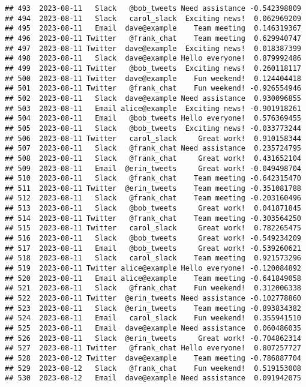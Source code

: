 \documentclass[
]{article}
\begin{document}
\begin{verbatim}
## 493  2023-08-11   Slack   @bob_tweets Need assistance -0.542398809
## 494  2023-08-11   Slack   carol_slack  Exciting news!  0.062969209
## 495  2023-08-11   Email  dave@example    Team meeting  0.146319367
## 496  2023-08-11 Twitter   @frank_chat    Team meeting  0.629940747
## 497  2023-08-11 Twitter  dave@example  Exciting news!  0.018387399
## 498  2023-08-11   Slack  dave@example Hello everyone!  0.879992486
## 499  2023-08-11 Twitter   @bob_tweets  Exciting news!  0.260118117
## 500  2023-08-11 Twitter  dave@example    Fun weekend!  0.124404418
## 501  2023-08-11 Twitter   @frank_chat    Fun weekend! -0.926554946
## 502  2023-08-11   Slack  dave@example Need assistance  0.930096855
## 503  2023-08-11   Email alice@example  Exciting news! -0.901918261
## 504  2023-08-11   Email   @bob_tweets Hello everyone!  0.576369455
## 505  2023-08-11   Slack   @bob_tweets  Exciting news! -0.033773244
## 506  2023-08-11 Twitter   carol_slack     Great work!  0.910158344
## 507  2023-08-11   Slack   @frank_chat Need assistance  0.235724795
## 508  2023-08-11   Slack   @frank_chat     Great work!  0.431652104
## 509  2023-08-11   Email  @erin_tweets     Great work! -0.049498704
## 510  2023-08-11   Slack   @frank_chat    Team meeting -0.642315470
## 511  2023-08-11 Twitter  @erin_tweets    Team meeting -0.351081788
## 512  2023-08-11   Slack   @frank_chat    Team meeting -0.203160496
## 513  2023-08-11   Slack   @bob_tweets     Great work!  0.041871845
## 514  2023-08-11 Twitter   @frank_chat    Team meeting -0.303564250
## 515  2023-08-11 Twitter   carol_slack     Great work!  0.782265475
## 516  2023-08-11   Slack   @bob_tweets     Great work! -0.549234209
## 517  2023-08-11   Email   @bob_tweets     Great work! -0.539260621
## 518  2023-08-11   Slack   carol_slack    Team meeting  0.921573296
## 519  2023-08-11 Twitter alice@example Hello everyone! -0.120084892
## 520  2023-08-11   Email alice@example    Team meeting -0.641849058
## 521  2023-08-11   Slack   @frank_chat    Fun weekend!  0.312006338
## 522  2023-08-11 Twitter  @erin_tweets Need assistance -0.102778860
## 523  2023-08-11   Slack  @erin_tweets    Team meeting -0.893834382
## 524  2023-08-11   Email   carol_slack    Fun weekend!  0.355941510
## 525  2023-08-11   Email  dave@example Need assistance  0.060486035
## 526  2023-08-11   Slack  @erin_tweets     Great work! -0.704862314
## 527  2023-08-11 Twitter   @frank_chat Hello everyone!  0.807257727
## 528  2023-08-12 Twitter  dave@example    Team meeting -0.786887704
## 529  2023-08-12   Slack   @frank_chat    Fun weekend!  0.519153008
## 530  2023-08-12   Email  dave@example Need assistance  0.091942075

\end{verbatim}
\end{document}

